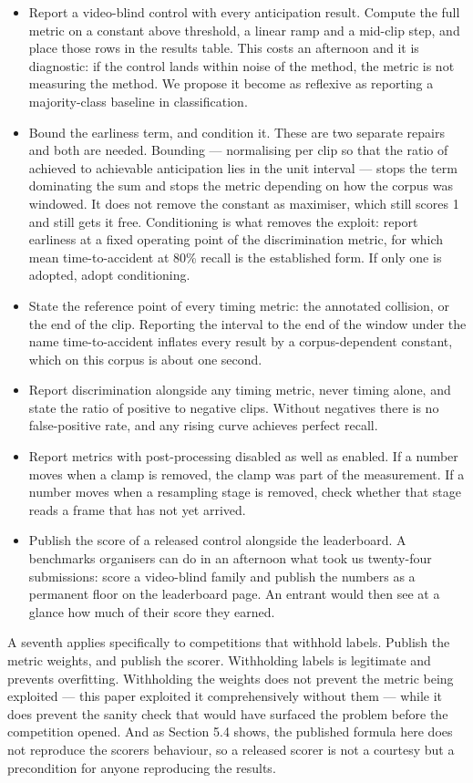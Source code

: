 \begin{itemize}
\item
  Report a video-blind control with every anticipation result. Compute the full metric on a constant above threshold, a linear ramp and a mid-clip step, and place those rows in the results table. This costs an afternoon and it is diagnostic: if the control lands within noise of the method, the metric is not measuring the method. We propose it become as reflexive as reporting a majority-class baseline in classification.
\item
  Bound the earliness term, and condition it. These are two separate repairs and both are needed. Bounding --- normalising per clip so that the ratio of achieved to achievable anticipation lies in the unit interval --- stops the term dominating the sum and stops the metric depending on how the corpus was windowed. It does not remove the constant as maximiser, which still scores 1 and still gets it free. Conditioning is what removes the exploit: report earliness at a fixed operating point of the discrimination metric, for which mean time-to-accident at 80\% recall is the established form. If only one is adopted, adopt conditioning.
\item
  State the reference point of every timing metric: the annotated collision, or the end of the clip. Reporting the interval to the end of the window under the name time-to-accident inflates every result by a corpus-dependent constant, which on this corpus is about one second.
\item
  Report discrimination alongside any timing metric, never timing alone, and state the ratio of positive to negative clips. Without negatives there is no false-positive rate, and any rising curve achieves perfect recall.
\item
  Report metrics with post-processing disabled as well as enabled. If a number moves when a clamp is removed, the clamp was part of the measurement. If a number moves when a resampling stage is removed, check whether that stage reads a frame that has not yet arrived.
\item
  Publish the score of a released control alongside the leaderboard. A benchmark\textquotesingle s organisers can do in an afternoon what took us twenty-four submissions: score a video-blind family and publish the numbers as a permanent floor on the leaderboard page. An entrant would then see at a glance how much of their score they earned.
\end{itemize}

A seventh applies specifically to competitions that withhold labels. Publish the metric weights, and publish the scorer. Withholding labels is legitimate and prevents overfitting. Withholding the weights does not prevent the metric being exploited --- this paper exploited it comprehensively without them --- while it does prevent the sanity check that would have surfaced the problem before the competition opened. And as Section 5.4 shows, the published formula here does not reproduce the scorer\textquotesingle s behaviour, so a released scorer is not a courtesy but a precondition for anyone reproducing the results.

